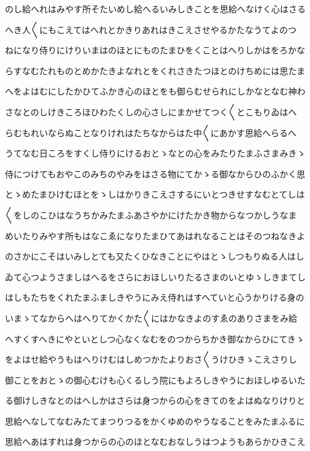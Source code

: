 \documentclass[a4paper,11pt,landscape]{ltjtarticle}
\begin{document}
のし給へれはみやす所そたいめし給へるいみしきことを思給へなけく心はさる
\par\medskip
へき人〱にもこえてはへれとかきりあれはきこえさせやるかたなうてよのつ
\par\medskip
ねになり侍りにけりいまはのほとにものたまひをくことはへりしかはをろかな
\par\medskip
らすなむたれものとめかたきよなれとをくれさきたつほとのけちめには思たま
\par\medskip
へをよはむにしたかひてふかき心のほとをも御らむせられにしかなとなむ神わ
\par\medskip
さなとのしけきころほひわたくしの心さしにまかせてつく〱とこもりゐはへ
\par\medskip
らむもれいならぬことなりけれはたちなからはた中〱にあかす思給へらるへ
\par\medskip
うてなむ日ころをすくし侍りにけるおとゝなとの心をみたりたまふさまみきゝ
\par\medskip
侍につけてもおやこのみちのやみをはさる物にてかゝる御なからひのふかく思
\par\medskip
とゝめたまひけむほとをゝしはかりきこえさするにいとつきせすなむとてしは
\par\medskip
〱をしのこひはなうちかみたまふあさやかにけたかき物からなつかしうなま
\par\medskip
めいたりみやす所もはなこゑになりたまひてあはれなることはそのつねなきよ
\par\medskip
のさかにこそはいみしとても又たくひなきことにやはとゝしつもりぬる人はし
\par\medskip
ゐて心つようさましはへるをさらにおほしいりたるさまのいとゆゝしきまてし
\par\medskip
はしもたちをくれたまふましきやうにみえ侍れはすへていと心うかりける身の
\par\medskip
いまゝてなからへはへりてかくかた〱にはかなきよのすゑのありさまをみ給
\par\medskip
へすくすへきにやといとしつ心なくなむをのつからちかき御なからひにてきゝ
\par\medskip
をよはせ給やうもはへりけむはしめつかたよりおさ〱うけひきゝこえさりし
\par\medskip
御ことをおとゝの御心むけも心くるしう院にもよろしきやうにおほしゆるいた
\par\medskip
る御けしきなとのはへしかはさらは身つからの心をきてのをよはぬなりけりと
\par\medskip
思給へなしてなむみたてまつりつるをかくゆめのやうなることをみたまふるに
\par\medskip
思給へあはすれは身つからの心のほとなむおなしうはつようもあらかひきこえ
\end{document}
